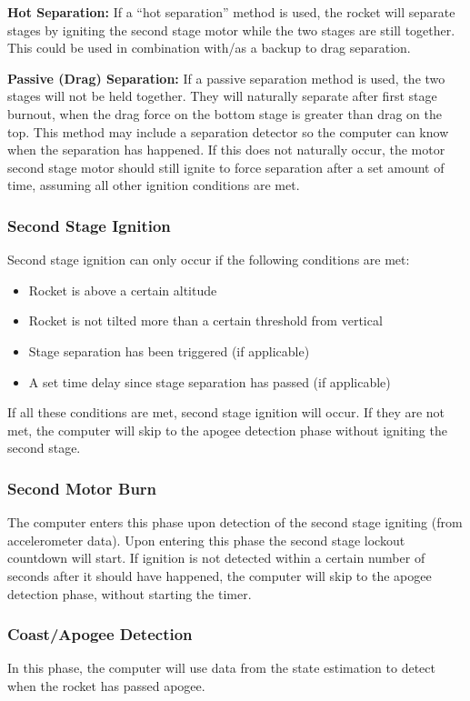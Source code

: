 \noindent\textbf{Hot Separation:} If a ``hot separation'' method is used, the rocket will separate stages by igniting the second stage motor while the two stages are still together. This could be used in combination with/as a backup to drag separation. 

\noindent\textbf{Passive (Drag) Separation:} If a passive separation method is used, the two stages will not be held together. They will naturally separate after first stage burnout, when the drag force on the bottom stage is greater than drag on the top. This method may include a separation detector so the computer can know when the separation has happened. If this does not naturally occur, the motor second stage motor should still ignite to force separation after a set amount of time, assuming all other ignition conditions are met.

\subsubsection*{Second Stage Ignition}
Second stage ignition can only occur if the following conditions are met:

\begin{itemize}
    \item Rocket is above a certain altitude
    \item Rocket is not tilted more than a certain threshold from vertical
    \item Stage separation has been triggered (if applicable)
    \item A set time delay since stage separation has passed (if applicable)
\end{itemize}

If all these conditions are met, second stage ignition will occur. If they are not met, the computer will skip to the apogee detection phase without igniting the second stage. 

\subsubsection*{Second Motor Burn}
The computer enters this phase upon detection of the second stage igniting (from accelerometer data). Upon entering this phase the second stage lockout countdown will start. If ignition is not detected within a certain number of seconds after it should have happened, the computer will skip to the apogee detection phase, without starting the timer.

\subsubsection*{Coast/Apogee Detection}
In this phase, the computer will use data from the state estimation to detect when the rocket has passed apogee. 

